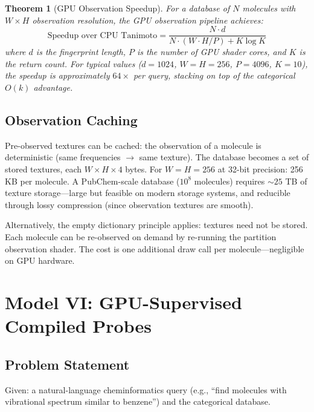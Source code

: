\documentclass[11pt,twocolumn,a4paper]{article}
\newtheorem{theorem}{Theorem}[section]
\theoremstyle{definition}
\theoremstyle{remark}
\begin{document}
\begin{theorem}[GPU Observation Speedup]
\label{thm:gpu_speedup}
For a database of $N$ molecules with $W \times H$ observation resolution, the GPU observation pipeline achieves:
\begin{equation}
\text{Speedup over CPU Tanimoto} = \frac{N \cdot d}{N \cdot (W \cdot H / P) + K \log K}
\label{eq:gpu_speedup}
\end{equation}
where $d$ is the fingerprint length, $P$ is the number of GPU shader cores, and $K$ is the return count. For typical values ($d = 1024$, $W = H = 256$, $P = 4096$, $K = 10$), the speedup is approximately $64\times$ per query, stacking on top of the categorical $O(k)$ advantage.
\end{theorem}

\subsection{Observation Caching}

Pre-observed textures can be cached: the observation of a molecule is deterministic (same frequencies $\to$ same texture). The database becomes a set of stored textures, each $W \times H \times 4$ bytes. For $W = H = 256$ at 32-bit precision: 256 KB per molecule. A PubChem-scale database ($10^8$ molecules) requires $\sim 25$ TB of texture storage---large but feasible on modern storage systems, and reducible through lossy compression (since observation textures are smooth).

Alternatively, the empty dictionary principle applies: textures need not be stored. Each molecule can be re-observed on demand by re-running the partition observation shader. The cost is one additional draw call per molecule---negligible on GPU hardware.


\section{Model VI: GPU-Supervised Compiled Probes}
\label{sec:model6}

\subsection{Problem Statement}

Given: a natural-language cheminformatics query (e.g., ``find molecules with vibrational spectrum similar to benzene'') and the categorical database.
\end{document}
